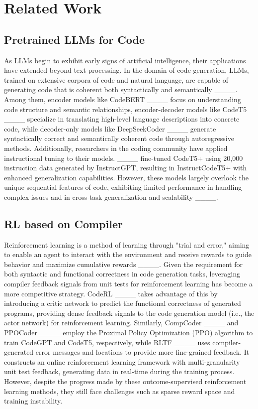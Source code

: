 \section{Related Work}
\subsection{Pretrained LLMs for Code}
As LLMs begin to exhibit early signs of artificial intelligence, their applications have extended beyond text processing. In the domain of code generation, LLMs, trained on extensive corpora of code and natural language, are capable of generating code that is coherent both syntactically and semantically ____. Among them, encoder models like CodeBERT ____ focus on understanding code structure and semantic relationships, encoder-decoder models like CodeT5 ____ specialize in translating high-level language descriptions into concrete code, while decoder-only models like DeepSeekCoder ____ generate syntactically correct and semantically coherent code through autoregressive methods. Additionally, researchers in the coding community have applied instructional tuning to their models. ____ fine-tuned CodeT5+ using 20,000 instruction data generated by InstructGPT, resulting in InstructCodeT5+ with enhanced generalization capabilities. However, these models largely overlook the unique sequential features of code, exhibiting limited performance in handling complex issues and in cross-task generalization and scalability ____.

\subsection{RL based on Compiler}
Reinforcement learning is a method of learning through "trial and error," aiming to enable an agent to interact with the environment and receive rewards to guide behavior and maximize cumulative rewards ____. Given the requirement for both syntactic and functional correctness in code generation tasks, leveraging compiler feedback signals from unit tests for reinforcement learning has become a more competitive strategy. CodeRL ____ takes advantage of this by introducing a critic network to predict the functional correctness of generated programs, providing dense feedback signals to the code generation model (i.e., the actor network) for reinforcement learning. Similarly, CompCoder ____ and PPOCoder ____ employ the Proximal Policy Optimization (PPO) algorithm to train CodeGPT and CodeT5, respectively, while RLTF ____ uses compiler-generated error messages and locations to provide more fine-grained feedback. It constructs an online reinforcement learning framework with multi-granularity unit test feedback, generating data in real-time during the training process. However, despite the progress made by these outcome-supervised reinforcement learning methods, they still face challenges such as sparse reward space and training instability.

